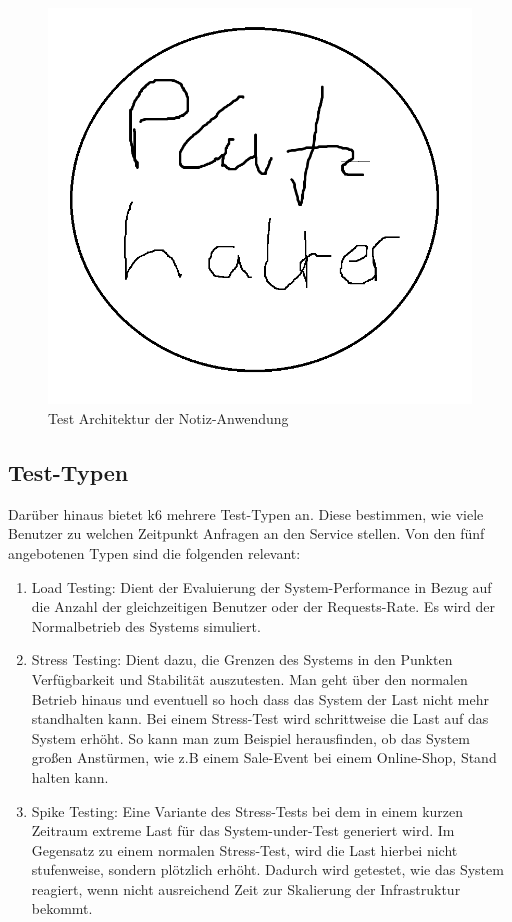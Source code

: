 \begin{figure}[H]
    \includegraphics[width=\textwidth]{img/platzhalter.png}
    \caption[Test Architektur der Notiz-Anwendung]{Test Architektur der Notiz-Anwendung}
    \label{fig:test-architecture}
\end{figure}

\subsection{Test-Typen}
Darüber hinaus bietet k6 mehrere Test-Typen an. Diese bestimmen, wie viele Benutzer zu welchen Zeitpunkt Anfragen an den Service stellen. Von den fünf angebotenen Typen sind die folgenden relevant:
\begin{enumerate}
    \item Load Testing: Dient der Evaluierung der System-Performance in Bezug auf die Anzahl der gleichzeitigen Benutzer oder der Requests-Rate. Es wird der Normalbetrieb des Systems simuliert.
    
    \item Stress Testing: Dient dazu, die Grenzen des Systems in den Punkten Verfügbarkeit und  Stabilität auszutesten. Man geht über den normalen Betrieb hinaus und eventuell so hoch dass das System der Last nicht mehr standhalten kann. Bei einem Stress-Test wird schrittweise die Last auf das System erhöht. So kann man zum Beispiel herausfinden, ob das System großen Anstürmen, wie z.B einem Sale-Event bei einem Online-Shop, Stand halten kann.
    
    \item Spike Testing: Eine Variante des Stress-Tests bei dem in einem kurzen Zeitraum extreme Last für das System-under-Test generiert wird. Im Gegensatz zu einem normalen Stress-Test, wird die Last hierbei nicht stufenweise, sondern plötzlich erhöht. Dadurch wird getestet, wie das System reagiert, wenn nicht ausreichend Zeit zur Skalierung der Infrastruktur bekommt.
\end{enumerate}

